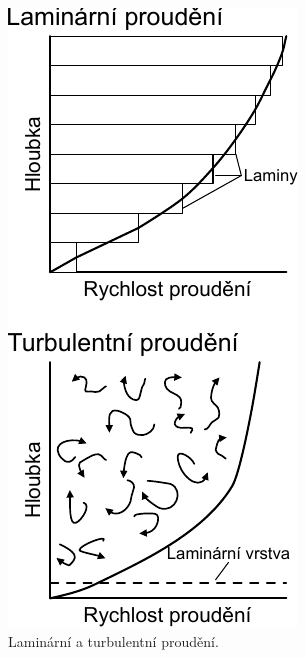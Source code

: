 \begin{figure}[h]
	\centering
	\includegraphics[width=1\linewidth]{obrazky/fluvial/laminar_turbul}
	\caption{Laminární a turbulentní proudění.}
	\label{fig:laminarturbul}
\end{figure}


